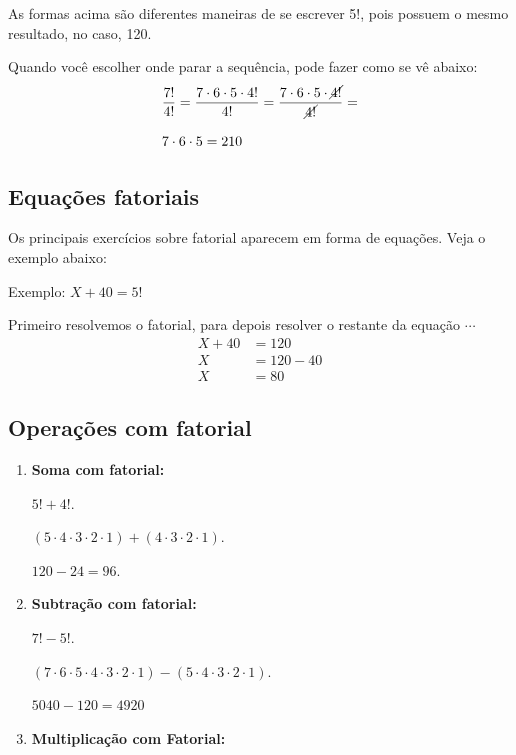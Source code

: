 \begin{multicols*}{2}
	As formas acima são diferentes maneiras de se escrever 5!, pois possuem o mesmo resultado, no caso, 120.

	Quando você escolher onde parar a sequência, pode fazer como se vê abaixo:
	\begin{align*}
		 & \dfrac{7!}{4!} = \dfrac{7 \cdot 6 \cdot 5 \cdot 4!}{4!} = \dfrac{7 \cdot 6 \cdot 5 \cdot \cancel{4!}}{ \cancel{4!}} = \\[2ex]
		 & 7 \cdot 6 \cdot 5 = 210
	\end{align*}

	\subsection*{Equações fatoriais}

	Os principais exercícios sobre fatorial aparecem em forma de equações. Veja o exemplo abaixo:

	Exemplo: {$X + 40 = 5!$}

	Primeiro resolvemos o fatorial, para depois resolver o restante da equação $\cdots $
	\begin{align*}
		X + 40 & = 120      \\
		X      & = 120 - 40 \\
		X      & = 80
	\end{align*}

	\subsection*{Operações com fatorial}

	\begin{enumerate}

		\item \textbf{Soma com fatorial:}

		      {$5! + 4!$}.

		      {$ (5 \cdot 4 \cdot 3 \cdot 2 \cdot 1) + (4 \cdot 3 \cdot 2 \cdot 1)$}.

		      {$ 120 - 24 = 96 $}.

		\item \textbf{Subtração com fatorial:}

		      {$ 7! - 5! $}.

		      {$ (7 \cdot 6 \cdot 5 \cdot 4 \cdot 3 \cdot 2 \cdot 1) - (5 \cdot 4 \cdot 3 \cdot 2 \cdot 1) $}.

		      {$ 5040 - 120 = 4920 $}

		\item \textbf{Multiplicação com Fatorial:}


\end{enumerate}
\end{multicols*}
